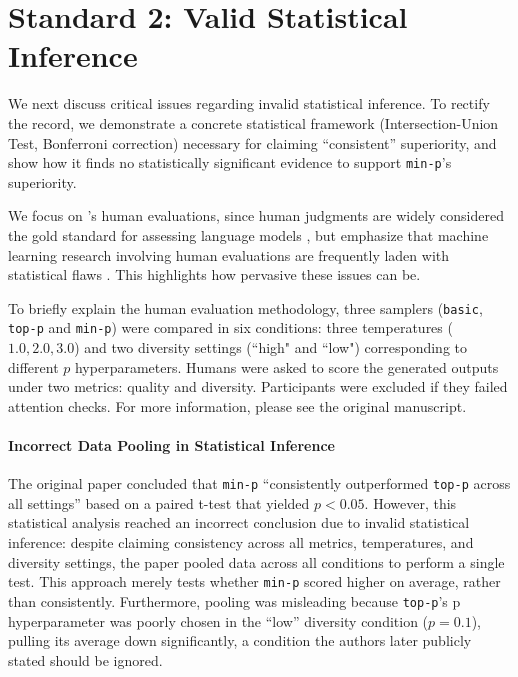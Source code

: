 \section{Standard 2: Valid Statistical Inference}


We next discuss critical issues regarding invalid statistical inference.
To rectify the record, we demonstrate a concrete statistical framework (Intersection-Union Test, Bonferroni correction) necessary for claiming ``consistent'' superiority, and show how it finds no statistically significant evidence to support \texttt{min-p}'s superiority.

We focus on \citet{nguyen2024minp}'s human evaluations, since human judgments are widely considered the gold standard for assessing language models \citep{van2019best,roller2020opendomainconversationalagentscurrent,howcroft2020twenty,clark2021all,liang2022holistic,khashabi2022geniereproduciblestandardizedhuman,chiang2024chatbotarenaopenplatform,biderman2024lessonstrenchesreproducibleevaluation,schaeffer2025correlatingpredictinghumanevaluations}, but emphasize that machine learning research involving human evaluations are frequently laden with statistical flaws \citep{freitag2021experts,belz2021reprogen,thomson2024common}.
This highlights how pervasive these issues can be.

To briefly explain the human evaluation methodology, three samplers (\texttt{basic}, \texttt{top-p} and \texttt{min-p}) were compared in six conditions: three temperatures ($1.0, 2.0, 3.0$) and two diversity settings (``high" and ``low") corresponding to different $p$ hyperparameters.
Humans were asked to score the generated outputs under two metrics: quality and diversity.
Participants were excluded if they failed attention checks.
For more information, please see the original manuscript.

\paragraph{Incorrect Data Pooling in Statistical Inference}

The original paper concluded that \texttt{min-p} ``consistently outperformed \texttt{top-p} across all settings'' based on a paired t-test that yielded $p<0.05$.
However, this statistical analysis reached an incorrect conclusion due to invalid statistical inference: despite claiming consistency across all metrics, temperatures, and diversity settings, the paper pooled data across all conditions to perform a single test.
This approach merely tests whether \texttt{min-p} scored higher on average, rather than consistently.
Furthermore, pooling was misleading because \texttt{top-p}'s p hyperparameter was poorly chosen in the ``low'' diversity condition ($p=0.1$), pulling its average down significantly, a condition the authors later publicly stated should be ignored.

